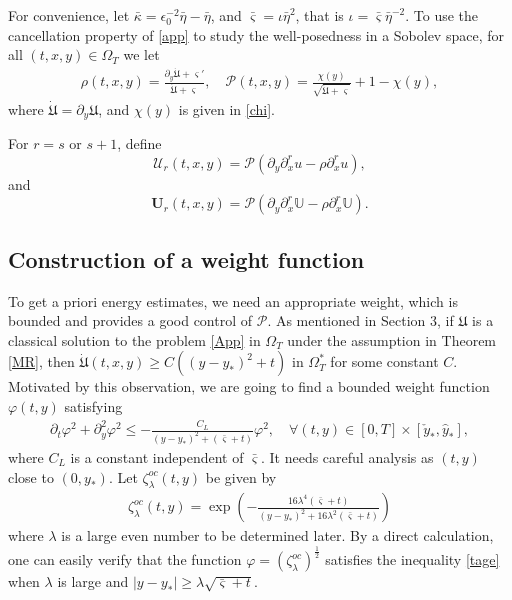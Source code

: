 \documentclass{amsart}
\numberwithin{equation}{section}
\begin{document}
For convenience,  let $\bar{\kappa}=\epsilon_{0}^{-2}\bar{\eta}-\bar{\eta}$,
and $\bar{\varsigma}=\iota\bar{\eta}^{2}$, that is $\iota=\bar{\varsigma}\bar{\eta}^{-2}$.
To use the cancellation property of \eqref{app} to study the well-posedness in a Sobolev space, for all $(t,x,y)\in\Omega_{T}$ we let
\begin{align}\label{rhoPd}
\rho(t,x,y)=\frac{\partial_{y}\dot{\mathfrak{U}}+\varsigma'}{\dot{\mathfrak{U}}+\varsigma}, \quad
\mathcal{P}(t,x,y)=\frac{\chi(y)}{\sqrt{\dot{\mathfrak{U}}+\varsigma}}+1-\chi(y),
\end{align}
where $\dot{\mathfrak{U}}=\partial_{y}\mathfrak{U}$, and $\chi(y)$ is given in \eqref{chi}.


For $r=s$ or $s+1$, define
$$\mathcal{U}_{r}(t,x,y)=\mathcal{P}(\partial_{y}\partial_{x}^{r}u-\rho\partial_{x}^{r}u),$$
and
$$\mathbf{U}_{r}(t,x,y)=\mathcal{P}\left(\partial_{y}\partial_{x}^{r}\mathbb{U}-\rho\partial_{x}^{r}\mathbb{U}\right). $$


\subsection{Construction of a weight function}

To get a priori energy estimates, we need an appropriate weight, which is bounded and provides a good control of $\mathcal{P}$. As mentioned in Section 3, if $\mathfrak{U}$ is a classical solution to the problem \eqref{App} in $\Omega_{T}$ under the assumption in Theorem \ref{MR}, then $\dot{\mathfrak{U}}(t,x,y)\geq C((y-y_{*})^{2}+t)$ in $\Omega_{T}^{*}$ for some constant $C$. Motivated by this observation, we are going to find a bounded weight function $\varphi(t,y)$ satisfying
\begin{align}\label{tage}
\partial_{t}\varphi^{2}+\partial_{y}^{2}\varphi^{2}\leq-\frac{C_{L}}{(y-y_{*})^{2}+(\bar{\varsigma}+t)}\varphi^{2},\quad
\forall (t,y)\in [0,T]\times[\check{y}_{*},\hat{y}_{*}],
\end{align}
where $C_{L}$ is a constant independent of $\bar{\varsigma}$.
It needs careful analysis as $(t,y)$ close to $(0,y_{*})$.
Let $\zeta_{\lambda}^{oc}(t,y)$ be given by
\begin{align*}
\zeta_{\lambda}^{oc}(t,y)=\exp\left({-\frac{16\lambda^{4}(\bar{\varsigma}+t)}{(y-y_{*})^{2}+16\lambda^{2}(\bar{\varsigma}+t)}}\right)
\end{align*}
where $\lambda$ is a large even number to be determined later. By a direct calculation, one can easily verify  that the function $\varphi=(\zeta_{\lambda}^{oc})^{\frac 12}$ satisfies the inequality \eqref{tage} when $\lambda$ is large and $|y-y_{*}|\geq \lambda\sqrt{\bar{\varsigma}+t}$.
\end{document}
